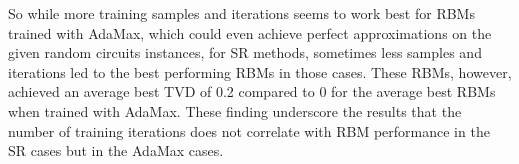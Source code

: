 So while more training samples and iterations seems to work best for RBMs trained with AdaMax, which could even 
achieve perfect approximations on the given random circuits instances, for SR methods, sometimes less samples and 
iterations led to the best performing RBMs in those cases. These RBMs, however, achieved an average best TVD of 0.2 
compared to 0 for the average best RBMs when trained with AdaMax. These finding underscore the results that 
the number of training iterations does not correlate with RBM performance in the SR cases but in the AdaMax cases.
\fi
